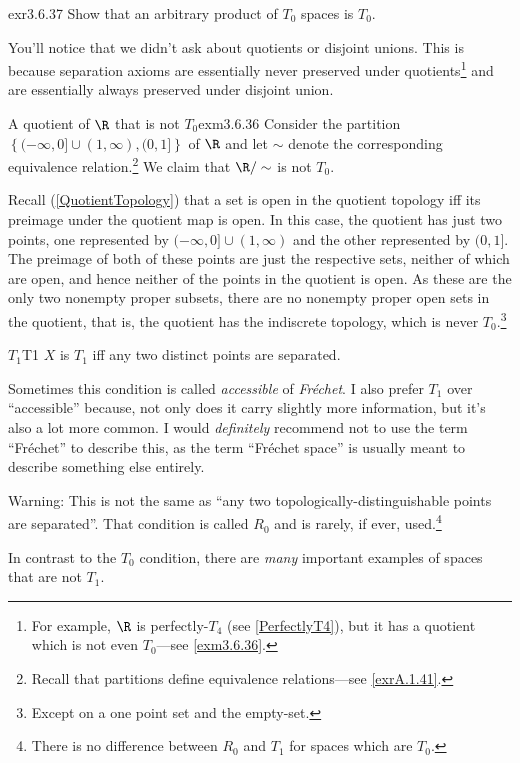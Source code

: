 \begin{exr}{}{exr3.6.37}
Show that an arbitrary product of $T_0$ spaces is $T_0$.
\end{exr}
You'll notice that we didn't ask about quotients or disjoint unions.  This is because separation axioms are essentially never preserved under quotients\footnote{For example, $\R$ is perfectly-$T_4$ (see \cref{PerfectlyT4}), but it has a quotient which is not even $T_0$---see \cref{exm3.6.36}.} and are essentially always preserved under disjoint union.
\begin{exm}{A quotient of $\R$ that is not $T_0$}{exm3.6.36}
Consider the partition $\left\{ (-\infty ,0]\cup (1,\infty ),(0,1]\right\}$ of $\R$ and let $\sim$ denote the corresponding equivalence relation.\footnote{Recall that partitions define equivalence relations---see \cref{exrA.1.41}.}  We claim that $\R /\sim$ is not $T_0$.

Recall (\cref{QuotientTopology}) that a set is open in the quotient topology iff its preimage under the quotient map is open.  In this case, the quotient has just two points, one represented by $(-\infty ,0]\cup (1,\infty )$ and the other represented by $(0,1]$.  The preimage of both of these points are just the respective sets, neither of which are open, and hence neither of the points in the quotient is open.  As these are the only two nonempty proper subsets, there are no nonempty proper open sets in the quotient, that is, the quotient has the indiscrete topology, which is never $T_0$.\footnote{Except on a one point set and the empty-set.}
\end{exm}
\begin{dfn}{$T_1$}{T1}
$X$ is \emph{$T_1$} iff any two distinct points are separated.
\begin{rmk}
Sometimes this condition is called \emph{accessible} of \emph{Fr\'{e}chet}.  I also prefer $T_1$ over ``accessible'' because, not only does it carry slightly more information, but it's also a lot more common.  I would \emph{definitely} recommend not to use the term ``Fr\'{e}chet'' to describe this, as the term ``Fr\'{e}chet space'' is usually meant to describe something else entirely.
\end{rmk}
\begin{wrn}
Warning:  This is not the same as ``any two topologically-distinguishable points are separated''.  That condition is called $R_0$ and is rarely, if ever, used.\footnote{There is no difference between $R_0$ and $T_1$ for spaces which are $T_0$.}
\end{wrn}
\begin{rmk}
In contrast to the $T_0$ condition, there are \emph{many} important examples of spaces that are not $T_1$.
\end{rmk}
\end{dfn}
